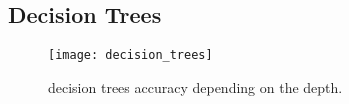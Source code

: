 
\subsection{Decision Trees}%
\label{sub:decision-trees}
\begin{figure}[H]
    \centering
    \texttt{[image: decision\_trees]}
    \caption{decision trees accuracy depending on the depth.}%
    \label{fig:knn_pca_lda_nca}
\end{figure}

